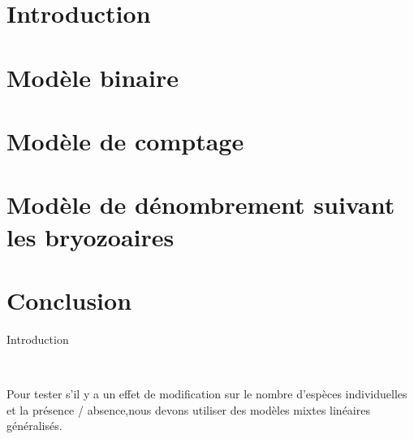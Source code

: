 \documentclass[unknownkeysallowed]{beamer}
\begin{document}
\section{Introduction}
\label{sec:motiv}
\section{Modèle binaire}
\label{sec:motiv}
\section{Modèle de comptage}
\label{sec:motiv}
\section{Modèle de dénombrement suivant les bryozoaires }
\label{sec:motiv}
\section{Conclusion}
\label{sec:motiv}
\begin{frame}{Introduction}
\begin{itemize}\setlength{\itemsep}{5pt}

\\

\end{itemize}
\end{frame}


\begin{frame}{}

Pour tester s'il y a un effet de modification sur le nombre d'espèces individuelles et la présence / absence,nous devons utiliser des modèles mixtes linéaires généralisés.

\end{frame}
\end{document}
